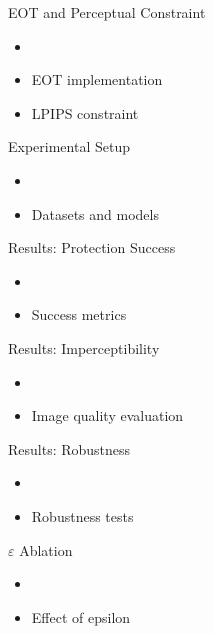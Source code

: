 \documentclass[aspectratio=169]{beamer}
\begin{document}
\begin{frame}{EOT and Perceptual Constraint}
    \begin{itemize}
        \item %
        \item EOT implementation
        \item LPIPS constraint
    \end{itemize}
\end{frame}

\begin{frame}{Experimental Setup}
    \begin{itemize}
        \item %
        \item Datasets and models
    \end{itemize}
\end{frame}

\begin{frame}{Results: Protection Success}
    \begin{itemize}
        \item %
        \item Success metrics
    \end{itemize}
\end{frame}

\begin{frame}{Results: Imperceptibility}
    \begin{itemize}
        \item %
        \item Image quality evaluation
    \end{itemize}
\end{frame}

\begin{frame}{Results: Robustness}
    \begin{itemize}
        \item %
        \item Robustness tests
    \end{itemize}
\end{frame}

\begin{frame}{$\varepsilon$ Ablation}
    \begin{itemize}
        \item %
        \item Effect of epsilon
    \end{itemize}
\end{frame}
\end{document}
